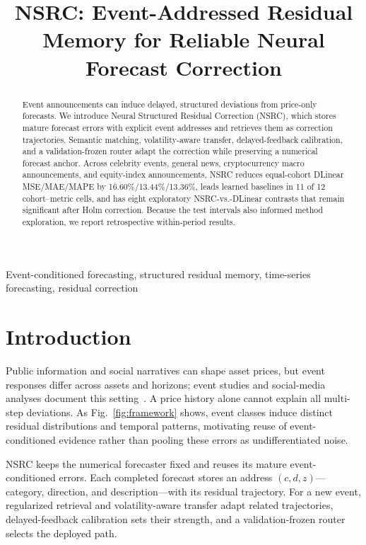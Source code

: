 \documentclass{article}
\title{NSRC: Event-Addressed Residual Memory for Reliable Neural Forecast Correction}
\begin{document}
\raggedbottom
\ninept
\maketitle
\begin{abstract}
Event announcements can induce delayed, structured deviations from price-only forecasts. We introduce Neural Structured Residual Correction (NSRC), which stores mature forecast errors with explicit event addresses and retrieves them as correction trajectories. Semantic matching, volatility-aware transfer, delayed-feedback calibration, and a validation-frozen router adapt the correction while preserving a numerical forecast anchor. Across celebrity events, general news, cryptocurrency macro announcements, and equity-index announcements, NSRC reduces equal-cohort DLinear MSE/MAE/MAPE by 16.60\%/13.44\%/13.36\%, leads learned baselines in 11 of 12 cohort--metric cells, and has eight exploratory NSRC-vs.-DLinear contrasts that remain significant after Holm correction. Because the test intervals also informed method exploration, we report retrospective within-period results.
\end{abstract}
\begin{keywords}
Event-conditioned forecasting, structured residual memory, time-series forecasting, residual correction
\end{keywords}

\section{Introduction}
Public information and social narratives can shape asset prices, but event responses differ across assets and horizons; event studies and social-media analyses document this setting~\cite{mackinlay1997event,antweiler2004all,oliveira2017impact,shiller2019narrative}. A price history alone cannot explain all multi-step deviations. As Fig.~\ref{fig:framework} shows, event classes induce distinct residual distributions and temporal patterns, motivating reuse of event-conditioned evidence rather than pooling these errors as undifferentiated noise.

NSRC keeps the numerical forecaster fixed and reuses its mature event-conditioned errors. Each completed forecast stores an address $(c,d,z)$—category, direction, and description—with its residual trajectory. For a new event, regularized retrieval and volatility-aware transfer adapt related trajectories, delayed-feedback calibration sets their strength, and a validation-frozen router selects the deployed path.
\end{document}
